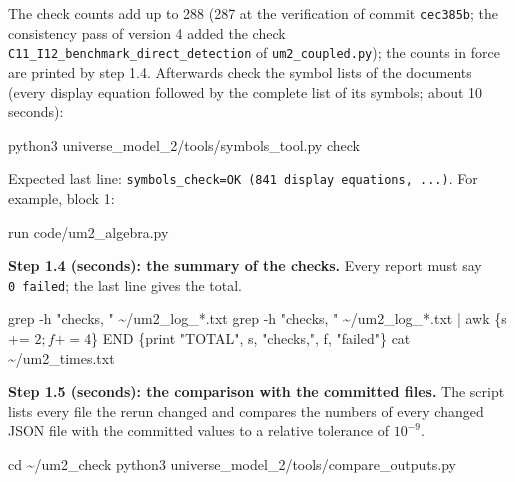 \documentclass[
  10pt,
]{article}
\newenvironment{Shaded}{}{}
\newcommand{\NormalTok}[1]{#1}
\begin{document}
The check counts add up to 288 (287 at the verification of commit
\texttt{cec385b}; the consistency pass of version 4 added the check
\texttt{C11\_I12\_benchmark\_direct\_detection} of
\texttt{um2\_coupled.py}); the counts in force are printed by step 1.4.
Afterwards check the symbol lists of the documents (every display
equation followed by the complete list of its symbols; about 10
seconds):

\begin{Shaded}
\begin{Highlighting}[]
\NormalTok{python3 universe\_model\_2/tools/symbols\_tool.py check}
\end{Highlighting}
\end{Shaded}

Expected last line:
\texttt{symbols\_check=OK\ (841\ display\ equations,\ ...)}. For
example, block 1:

\begin{Shaded}
\begin{Highlighting}[]
\NormalTok{run code/um2\_algebra.py}
\end{Highlighting}
\end{Shaded}

\textbf{Step 1.4 (seconds): the summary of the checks.} Every report
must say \texttt{0\ failed}; the last line gives the total.

\begin{Shaded}
\begin{Highlighting}[]
\NormalTok{grep {-}h "checks, " \textasciitilde{}/um2\_log\_*.txt}
\NormalTok{grep {-}h "checks, " \textasciitilde{}/um2\_log\_*.txt | awk \textquotesingle{}\{s += $2; f += $4\} END \{print "TOTAL", s, "checks,", f, "failed"\}\textquotesingle{}}
\NormalTok{cat \textasciitilde{}/um2\_times.txt}
\end{Highlighting}
\end{Shaded}

\textbf{Step 1.5 (seconds): the comparison with the committed files.}
The script lists every file the rerun changed and compares the numbers
of every changed JSON file with the committed values to a relative
tolerance of \(10^{-9}\).

\begin{Shaded}
\begin{Highlighting}[]
\NormalTok{cd \textasciitilde{}/um2\_check}
\NormalTok{python3 universe\_model\_2/tools/compare\_outputs.py}
\end{Highlighting}
\end{Shaded}
\end{document}
